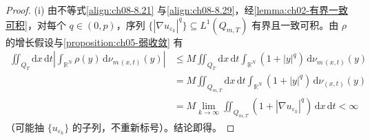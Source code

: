 \documentclass[../../main.tex]{subfiles}%
\begin{document}
\begin{proof}
(i) 由不等式\eqref{align:ch08-8.21} 与\eqref{align:ch08-8.29}，经\cref{lemma:ch02-有界一致可积}，对每个 $q\in(0,p)$，序列 $\{|\nabla u_{\varepsilon_k}|^q\}\subseteq L^1(Q_{m,T})$ 有界且一致可积。由 $\rho$ 的增长假设与\cref{proposition:ch05-弱收敛} 有
\begin{align*}
\iint_{Q_T}\mathrm{d}x\,\mathrm{d}t\left|\int_{\mathbb{R}^N}\rho(y)\,\mathrm{d}\nu_{m\,(x,t)}(y)\right|
&\leqslant M\iint_{Q_T}\mathrm{d}x\,\mathrm{d}t\int_{\mathbb{R}^N}(1+|y|^q)\,\mathrm{d}\nu_{m\,(x,t)}(y)\\
&=M\iint_{Q_{m,T}}\mathrm{d}x\,\mathrm{d}t\int_{\mathbb{R}^N}(1+|y|^q)\,\mathrm{d}\nu_{(x,t)}(y)\\
&=M\lim_{k\to\infty}\iint_{Q_{m,T}}(1+|\nabla u_{\varepsilon_k}|^q)\,\mathrm{d}x\,\mathrm{d}t<\infty
\end{align*}
（可能抽 $\{u_{\varepsilon_k}\}$ 的子列，不重新标号）。结论即得。


\end{proof}
\end{document}
